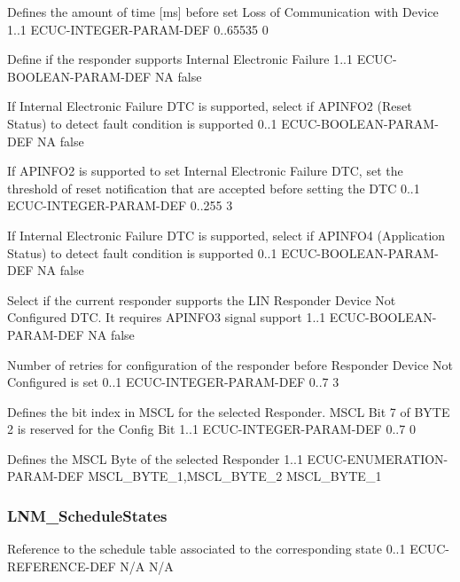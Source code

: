 {Defines the amount of time [ms] before set Loss of Communication with Device}
{1..1}
{ECUC-INTEGER-PARAM-DEF}
{0..65535}
{0}


{Define if the responder supports Internal Electronic Failure}
{1..1}
{ECUC-BOOLEAN-PARAM-DEF}
{NA}
{false}


{If Internal Electronic Failure DTC is supported, select if APINFO2 (Reset Status) to detect fault condition is supported}
{0..1}
{ECUC-BOOLEAN-PARAM-DEF}
{NA}
{false}		


{If APINFO2 is supported to set Internal Electronic Failure DTC, set the threshold of reset notification that are accepted before setting the DTC}
{0..1}
{ECUC-INTEGER-PARAM-DEF}
{0..255}
{3}


{If Internal Electronic Failure DTC is supported, select if APINFO4 (Application Status) to detect fault condition is supported}
{0..1}
{ECUC-BOOLEAN-PARAM-DEF}
{NA}
{false}


{Select if the current responder supports the LIN Responder Device Not Configured DTC. It requires APINFO3 signal support }
{1..1}
{ECUC-BOOLEAN-PARAM-DEF}
{NA}
{false}


{Number of retries for configuration of the responder before Responder Device Not Configured is set}
{0..1}
{ECUC-INTEGER-PARAM-DEF}
{0..7}
{3}		


{Defines the bit index in MSCL for the selected Responder. MSCL Bit 7 of BYTE 2 is reserved for the Config Bit}
{1..1}
{ECUC-INTEGER-PARAM-DEF}
{0..7}
{0}


{Defines the MSCL Byte of the selected Responder}
{1..1}
{ECUC-ENUMERATION-PARAM-DEF}
{MSCL_BYTE_1,MSCL_BYTE_2}
{MSCL_BYTE_1}


\subsubsection{LNM_ScheduleStates}

{Reference to the schedule table associated to the corresponding state}
{0..1}
{ECUC-REFERENCE-DEF}
{N/A}
{N/A}


